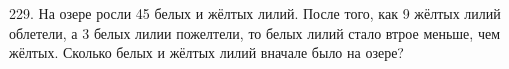 229. На озере росли 45 белых и жёлтых лилий. После того, как 9 жёлтых лилий облетели, а 3 белых лилии пожелтели, то белых лилий стало втрое меньше, чем жёлтых. Сколько белых и жёлтых лилий вначале было на озере?\\
